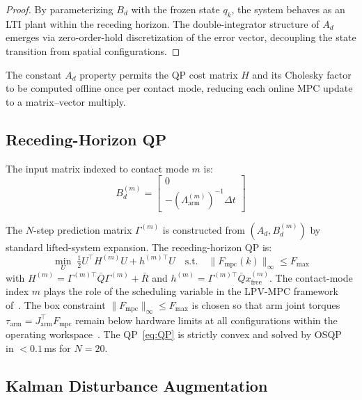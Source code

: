 \documentclass[journal]{IEEEtran}
\newcommand{\Fmpc}{F_{\text{mpc}}}
\begin{document}
\begin{proof}
By parameterizing $B_d$ with the frozen state $q_k$, the system behaves as
an LTI plant within the receding horizon.
The double-integrator structure of $A_d$ emerges via zero-order-hold
discretization of the error vector, decoupling the state transition from
spatial configurations.
\end{proof}

The constant $A_d$ property permits the QP cost matrix $H$ and its Cholesky
factor to be computed offline once per contact mode, reducing each online
MPC update to a matrix--vector multiply.

\subsection{Receding-Horizon QP}

The input matrix indexed to contact mode $m$ is:
\begin{equation}\label{eq:Bd}
  B_d^{(m)} = \begin{bmatrix}0 \\ -(\Lambda_{\text{arm}}^{(m)})^{-1}\Delta t\end{bmatrix}
\end{equation}

The $N$-step prediction matrix $\Gamma^{(m)}$ is constructed from
$(A_d,B_d^{(m)})$ by standard lifted-system expansion.
The receding-horizon QP is:
\begin{equation}\label{eq:QP}
  \min_{U}\;\tfrac{1}{2}U^\top H^{(m)}U + h^{(m)\top}U
  \quad\text{s.t.}\quad \|\Fmpc(k)\|_\infty\leq F_{\max}
\end{equation}
with $H^{(m)}=\Gamma^{(m)\top}\bar{Q}\Gamma^{(m)}+\bar{R}$ and
$h^{(m)}=\Gamma^{(m)\top}\bar{Q}x_{\text{free}}^{(m)}$.
The contact-mode index $m$ plays the role of the scheduling variable in the
LPV-MPC framework of~\cite{cao2005minmax}.
The box constraint $\|\Fmpc\|_\infty\leq F_{\max}$ is chosen so that arm
joint torques $\tau_{\text{arm}}=J_{\text{arm}}^\top\Fmpc$ remain below
hardware limits at all configurations within the operating
workspace~\cite{cao2002antiwindup}.
The QP~\eqref{eq:QP} is strictly convex and solved by OSQP~\cite{stellato2020osqp}
in $<0.1$\,ms for $N=20$.

\subsection{Kalman Disturbance Augmentation}
\end{document}
